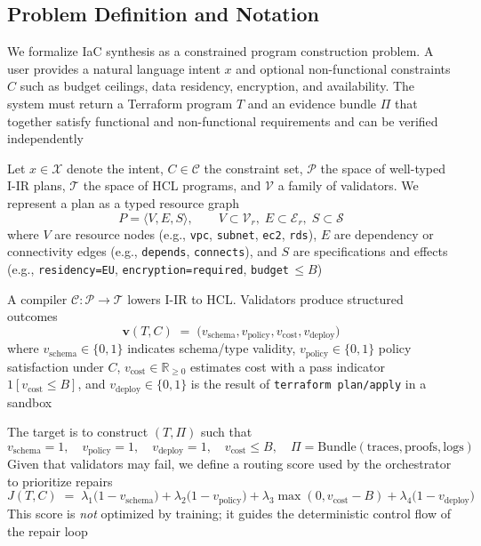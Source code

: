 \documentclass[acmsmall,screen,review,anonymous]{acmart}
\begin{document}
\subsection{Problem Definition and Notation}
\label{sec:problem}

We formalize IaC synthesis as a constrained program construction problem. A user provides a natural language intent $x$ and optional non-functional constraints $C$ such as budget ceilings, data residency, encryption, and availability. The system must return a Terraform program $T$ and an evidence bundle $\Pi$ that together satisfy functional and non-functional requirements and can be verified independently

Let $x \in \mathcal{X}$ denote the intent, $C \in \mathcal{C}$ the constraint set, $\mathcal{P}$ the space of well-typed I-IR plans, $\mathcal{T}$ the space of HCL programs, and $\mathcal{V}$ a family of validators. We represent a plan as a typed resource graph
\begin{equation}
P = \langle V, E, S \rangle,\qquad V \subset \mathcal{V}_r,\; E \subset \mathcal{E}_r,\; S \subset \mathcal{S}
\end{equation}
where $V$ are resource nodes (e.g., \texttt{vpc}, \texttt{subnet}, \texttt{ec2}, \texttt{rds}), $E$ are dependency or connectivity edges (e.g., \texttt{depends}, \texttt{connects}), and $S$ are specifications and effects (e.g., \texttt{residency=EU}, \texttt{encryption=required}, \texttt{budget}\,$\le B$)

A compiler $\mathcal{C}:\mathcal{P}\rightarrow\mathcal{T}$ lowers I-IR to HCL. Validators produce structured outcomes
\begin{equation}
\mathbf{v}(T, C) \;=\; \big( v_{\text{schema}}, v_{\text{policy}}, v_{\text{cost}}, v_{\text{deploy}} \big)
\end{equation}
where $v_{\text{schema}} \in \{0,1\}$ indicates schema/type validity, $v_{\text{policy}} \in \{0,1\}$ policy satisfaction under $C$, $v_{\text{cost}} \in \mathbb{R}_{\ge 0}$ estimates cost with a pass indicator $1\!\left[v_{\text{cost}} \le B\right]$, and $v_{\text{deploy}} \in \{0,1\}$ is the result of \texttt{terraform plan/apply} in a sandbox

The target is to construct $(T,\Pi)$ such that
\begin{equation}
v_{\text{schema}} = 1,\quad v_{\text{policy}} = 1,\quad v_{\text{deploy}} = 1,\quad v_{\text{cost}} \le B,\quad \Pi = \mathrm{Bundle}(\text{traces},\text{proofs},\text{logs})
\end{equation}
Given that validators may fail, we define a routing score used by the orchestrator to prioritize repairs
\begin{equation}
J(T,C) \;=\; \lambda_1 \big(1 - v_{\text{schema}}\big) + \lambda_2 \big(1 - v_{\text{policy}}\big) + \lambda_3 \max(0, v_{\text{cost}} - B) + \lambda_4 \big(1 - v_{\text{deploy}}\big)
\label{eq:routing}
\end{equation}
This score is \emph{not} optimized by training; it guides the deterministic control flow of the repair loop
\end{document}
